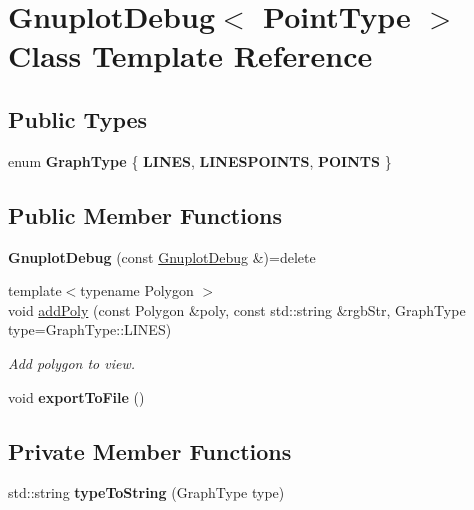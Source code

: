 \hypertarget{class_gnuplot_debug}{}\section{Gnuplot\+Debug$<$ Point\+Type $>$ Class Template Reference}
\label{class_gnuplot_debug}
\subsection*{Public Types}
\begin{DoxyCompactItemize}
\item 
\mbox{\label{class_gnuplot_debug_a7f9f4b6f6232f04a49b6826211e10e81}} 
enum {\bfseries Graph\+Type} \{ {\bfseries L\+I\+N\+ES}, 
{\bfseries L\+I\+N\+E\+S\+P\+O\+I\+N\+TS}, 
{\bfseries P\+O\+I\+N\+TS}
 \}
\end{DoxyCompactItemize}
\subsection*{Public Member Functions}
\begin{DoxyCompactItemize}
\item 
\mbox{\label{class_gnuplot_debug_ac5fe70017e88c33c296439b5eac9fe91}} 
{\bfseries Gnuplot\+Debug} (const \mbox{\hyperlink{class_gnuplot_debug}{Gnuplot\+Debug}} \&)=delete
\item 
{\footnotesize template$<$typename Polygon $>$ }\\void \mbox{\hyperlink{class_gnuplot_debug_a6a7c67bbc05029c50f9a8d80db0e17c0}{add\+Poly}} (const Polygon \&poly, const std\+::string \&rgb\+Str, Graph\+Type type=Graph\+Type\+::\+L\+I\+N\+ES)
\begin{DoxyCompactList}\small\item\em Add polygon to view. \end{DoxyCompactList}\item 
\mbox{\label{class_gnuplot_debug_ac727f20a69cf6ab905ef30df076b93ad}} 
void {\bfseries export\+To\+File} ()
\end{DoxyCompactItemize}
\subsection*{Private Member Functions}
\begin{DoxyCompactItemize}
\item 
\mbox{\label{class_gnuplot_debug_a3a8a3177495da970501359805e24afd3}} 
std\+::string {\bfseries type\+To\+String} (Graph\+Type type)
\end{DoxyCompactItemize}
